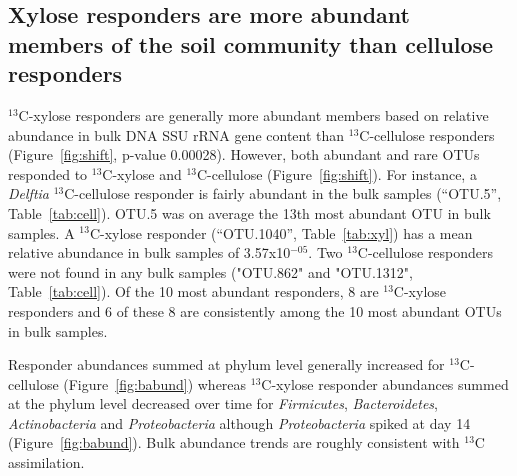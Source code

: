 \subsection{Xylose responders are more abundant members of the soil community
than cellulose responders}
$^{13}$C-xylose responders are generally more abundant members based on
relative abundance in bulk DNA SSU rRNA gene content than $^{13}$C-cellulose
responders (Figure~\ref{fig:shift}, p-value 0.00028).  However, both abundant
and rare OTUs responded to $^{13}$C-xylose and $^{13}$C-cellulose
(Figure~\ref{fig:shift}). For instance, a \textit{Delftia} $^{13}$C-cellulose
responder is fairly abundant in the bulk samples (``OTU.5'',
Table~\ref{tab:cell}). OTU.5 was on average the 13th most abundant OTU in bulk
samples. A $^{13}$C-xylose responder (``OTU.1040'', Table~\ref{tab:xyl}) has a
mean relative abundance in bulk samples of 3.57x10$^{-05}$. Two
$^{13}$C-cellulose responders were not found in any bulk samples ("OTU.862" and
"OTU.1312", Table~\ref{tab:cell}). Of the 10 most abundant responders, 8 are
$^{13}$C-xylose responders and 6 of these 8 are consistently among the 10 most
abundant OTUs in bulk samples.

Responder abundances summed at phylum level generally increased for
$^{13}$C-cellulose (Figure~\ref{fig:babund}) whereas $^{13}$C-xylose
responder abundances summed at the phylum level decreased over time for
\textit{Firmicutes}, \textit{Bacteroidetes}, \textit{Actinobacteria} and
\textit{Proteobacteria} although \textit{Proteobacteria} spiked at day 14
(Figure~\ref{fig:babund}). Bulk abundance trends are roughly consistent
with $^{13}$C assimilation.

